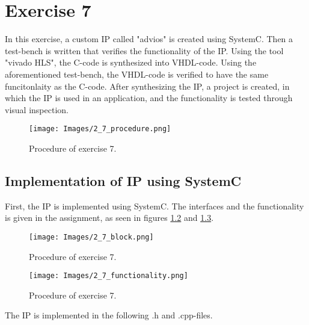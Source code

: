 
\chapter{Exercise 7}

In this exercise, a custom IP called "advios" is created using SystemC. Then a test-bench is written that verifies the functionality of the IP. Using the tool "vivado HLS", the C-code is synthesized into VHDL-code. Using the aforementioned test-bench, the VHDL-code is verified to have the same funcitonlaity as the C-code.
After synthesizing the IP, a project is created, in which the IP is used in an application, and the functionality is tested through visual inspection.

\begin{figure}[H]
	\centering
	{\texttt{[image: Images/2\_7\_procedure.png]}}\\[0.5cm]
	\label{fig:7_procedure}
	\caption{Procedure of exercise 7.}
\end{figure}

\FloatBarrier

\section{Implementation of IP using SystemC}
First, the IP is implemented using SystemC. The interfaces and the functionality is given in the assignment, as seen in figures \ref{fig:7_block} and \ref{fig:7_functionality}.

\begin{figure}[b]
	\centering
	{\texttt{[image: Images/2\_7\_block.png]}}\\[0.5cm]
	\label{fig:7_block}
	\caption{Procedure of exercise 7.}
\end{figure}
\begin{figure}[H]
	\centering
	{\texttt{[image: Images/2\_7\_functionality.png]}}\\[0.5cm]
	\label{fig:7_functionality}
	\caption{Procedure of exercise 7.}
\end{figure}

\FloatBarrier

The IP is implemented in the following .h and .cpp-files.

